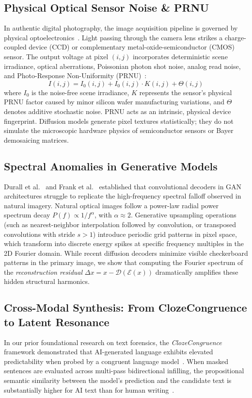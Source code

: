 \documentclass[conference]{IEEEtran}
\theoremstyle{definition}
\begin{document}
\subsection{Physical Optical Sensor Noise \& PRNU}
In authentic digital photography, the image acquisition pipeline is governed by physical optoelectronics~\cite{fridrich2009digital}. Light passing through the camera lens strikes a charge-coupled device (CCD) or complementary metal-oxide-semiconductor (CMOS) sensor. The output voltage at pixel $(i, j)$ incorporates deterministic scene irradiance, optical aberrations, Poissonian photon shot noise, analog read noise, and Photo-Response Non-Uniformity (PRNU)~\cite{lukas2006digital}:
\begin{equation}
I(i, j) = I_0(i, j) + I_0(i, j) \cdot K(i, j) + \Theta(i, j)
\end{equation}
where $I_0$ is the noise-free scene irradiance, $K$ represents the sensor's physical PRNU factor caused by minor silicon wafer manufacturing variations, and $\Theta$ denotes additive stochastic noise. PRNU acts as an intrinsic, physical device fingerprint. Diffusion models generate pixel textures statistically; they do not simulate the microscopic hardware physics of semiconductor sensors or Bayer demosaicing matrices.

\subsection{Spectral Anomalies in Generative Models}
Durall et al.~\cite{durall2020watch} and Frank et al.~\cite{frank2020leveraging} established that convolutional decoders in GAN architectures struggle to replicate the high-frequency spectral falloff observed in natural imagery. Natural optical images follow a power-law radial power spectrum decay $P(f) \propto 1 / f^\alpha$, with $\alpha \approx 2$. Generative upsampling operations (such as nearest-neighbor interpolation followed by convolution, or transposed convolutions with stride $s > 1$) introduce periodic grid patterns in pixel space, which transform into discrete energy spikes at specific frequency multiples in the 2D Fourier domain. While recent diffusion decoders minimize visible checkerboard patterns in the primary image, we show that computing the Fourier spectrum of the \textit{reconstruction residual} $\Delta x = x - \mathcal{D}(\mathcal{E}(x))$ dramatically amplifies these hidden structural harmonics.

\subsection{Cross-Modal Synthesis: From ClozeCongruence to Latent Resonance}
In our prior foundational research on text forensics, the \textit{ClozeCongruence} framework demonstrated that AI-generated language exhibits elevated predictability when probed by a congruent language model~\cite{bandyopadhyay2026cloze1,bandyopadhyay2026dna}. When masked sentences are evaluated across multi-pass bidirectional infilling, the propositional semantic similarity between the model's prediction and the candidate text is substantially higher for AI text than for human writing~\cite{bandyopadhyay2026scaling,bandyopadhyay2026cloze3}. 
\end{document}
